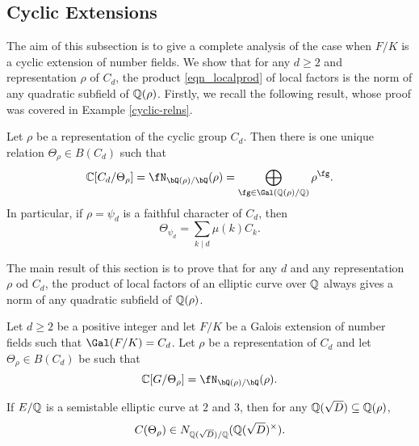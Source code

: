 \subsection{Cyclic Extensions}\label{sec_cyclic}

The aim of this subsection is to give a complete analysis of the case when $F/K$ is a cyclic extension of number fields. We show that for any $d\geq 2$ and representation $\rho$ of $C_d$, the product \eqref{eqn_localprod} of local factors is the norm of any quadratic subfield of $\mathbb{Q}(\rho)$. 
Firstly, we recall the following result, whose proof was covered in Example \ref{cyclic-relns}.

\begin{lemma}\label{lem_relation}
    Let $\rho$ be a representation of the cyclic group $C_d$. Then there is one unique relation $\Theta_\rho\in B(C_d)$ such that 
    $$\CC[C_d/\Theta_{\rho}]=\repnorm{\rho}=\bigoplus_{\fg\in\Gal(\QQ(\rho)/\QQ)}\rho^{\fg}.$$
    In particular, if $\rho=\psi_d$ is a faithful character of $C_d$, then
    $$\Theta_{\psi_d}=\sum_{k\mid d}\mu(k)C_k.$$
\end{lemma}




The main result of this section is to prove that for any $d$ and any representation $\rho$ od $C_d$, the product of local factors of an elliptic curve over $\mathbb{Q}$ always gives a norm of any quadratic subfield of $\mathbb{Q}(\rho)$.

\begin{thm}\label{thm_consistent_cyclic}
    Let $d\geq2$ be a positive integer and let $F/K$ be a Galois extension of number fields such that $\Gal(F/K)=C_d$. Let $\rho$ be a representation of $C_d$ and let $\Theta_\rho\in B(C_d)$ be such that
    $$\CC[G/\Theta_\rho]=\repnorm{\rho}.$$

    If $E/\mathbb{Q}$ is a semistable elliptic curve at $2$ and $3$, then for any $\mathbb{Q}(\sqrt{D})\subseteq\mathbb{Q}(\rho)$,
    $$C(\Theta_\rho)\in N_{\mathbb{Q}(\sqrt{D})/\mathbb{Q}}(\mathbb{Q}(\sqrt{D})^{\times}).$$
\end{thm}

